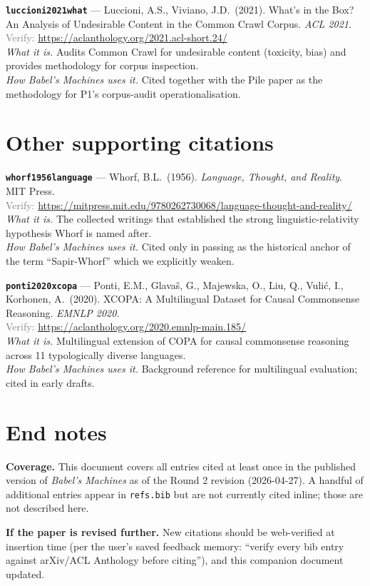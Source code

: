 \documentclass[11pt,a4paper]{article}
\newcommand{\entry}[5]{%
  \par\smallskip
  \noindent\textbf{\texttt{#1}} --- #2\\
  {\footnotesize \textcolor{gray}{Verify:} \url{#3}}\\
  \textit{What it is.} #4\\
  \textit{How Babel's Machines uses it.} #5
  \par\medskip
}
\begin{document}
\entry{luccioni2021what}
{Luccioni, A.S., Viviano, J.D.\ (2021). What's in the Box? An Analysis of Undesirable Content in the Common Crawl Corpus. \emph{ACL 2021}.}
{https://aclanthology.org/2021.acl-short.24/}
{Audits Common Crawl for undesirable content (toxicity, bias) and provides methodology for corpus inspection.}
{Cited together with the Pile paper as the methodology for P1's corpus-audit operationalisation.}

\section{Other supporting citations}

\entry{whorf1956language}
{Whorf, B.L.\ (1956). \emph{Language, Thought, and Reality}. MIT Press.}
{https://mitpress.mit.edu/9780262730068/language-thought-and-reality/}
{The collected writings that established the strong linguistic-relativity hypothesis Whorf is named after.}
{Cited only in passing as the historical anchor of the term ``Sapir-Whorf'' which we explicitly weaken.}

\entry{ponti2020xcopa}
{Ponti, E.M., Glava\v{s}, G., Majewska, O., Liu, Q., Vuli\'c, I., Korhonen, A.\ (2020). XCOPA: A Multilingual Dataset for Causal Commonsense Reasoning. \emph{EMNLP 2020}.}
{https://aclanthology.org/2020.emnlp-main.185/}
{Multilingual extension of COPA for causal commonsense reasoning across 11 typologically diverse languages.}
{Background reference for multilingual evaluation; cited in early drafts.}

\section*{End notes}

\textbf{Coverage.} This document covers all entries cited at least once in the published version of \emph{Babel's Machines} as of the Round 2 revision (2026-04-27). A handful of additional entries appear in \texttt{refs.bib} but are not currently cited inline; those are not described here.

\textbf{If the paper is revised further.} New citations should be web-verified at insertion time (per the user's saved feedback memory: ``verify every bib entry against arXiv/ACL Anthology before citing''), and this companion document updated.
\end{document}
